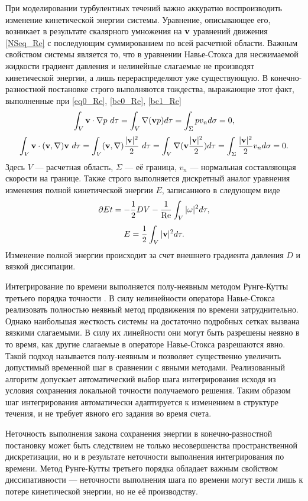 При моделировании турбулентных течений важно аккуратно воспроизводить изменение кинетической энергии системы. Уравнение, описывающее его, возникает в результате скалярного умножения на $\mathbf{v}$ уравнений движения \eqref{NSeq_Re} с последующим суммированием по всей расчетной области. Важным свойством системы является то, что в уравнении Навье-Стокса для несжимаемой жидкости градиент давления и нелинейные слагаемые не производят кинетической энергии, а лишь перераспределяют уже существующую. В конечно-разностной постановке строго выполняются тождества, выражающие этот факт, выполненные при \eqref{eq0_Re}, \eqref{bc0_Re}, \eqref{bc1_Re}
$$
\int_V \mathbf{v} \cdot \nabla p\ d\tau= \int_V \nabla (\mathbf{v} p) d\tau = \int_{\Sigma} p v_n d\sigma = 0, 
$$
$$
\int_V \mathbf{v} \cdot (\mathbf{v}, \nabla) \mathbf{v}\ d\tau = \int_V (\mathbf{v}, \nabla)\frac{|\mathbf{v}|^2}{2}\ d\tau = \int_V \nabla (\mathbf{v} \frac{|\mathbf{v}|^2}{2}) d\tau = \int_{\Sigma} \frac{|\mathbf{v}|^2}{2} v_n d\sigma = 0.
$$
Здесь $V$ --- расчетная область, $\Sigma$ --- её граница, $v_n$ --- нормальная составляющая скорости на границе. Также строго выполняется дискретный аналог уравнения изменения полной кинетической энергии $E$, записанного в следующем виде
\begin{equation} \label{Eeq}
\partial{E}{t} = - \frac{1}{2}DV - \frac{1}{\operatorname{Re}} \int_{V} |\omega|^2 d\tau,
\end{equation}
$$
E = \frac{1}{2}\int_{V} |\mathbf{v}|^2 d\tau.
$$
Изменение полной энергии происходит за счет внешнего градиента давления $D$ и вязкой диссипации. 

Интегрирование по времени выполняется полу-неявным методом Рунге-Кутты третьего порядка точности \cite{Nikitin2006third}. В силу нелинейности оператора Навье-Стокса реализовать полностью неявный метод продвижения по времени затруднительно. Однако наибольшая жесткость системы на достаточно подробных сетках вызвана вязкими слагаемыми. В силу их линейности они могут быть разрешены неявно в то время, как другие слагаемые в операторе Навье-Стокса разрешаются явно. Такой подход называется полу-неявным и позволяет существенно увеличить допустимый временной шаг в сравнении с явными методами. Реализованный алгоритм допускает автоматический выбор шага интегрирования исходя из условия сохранения локальной точности получаемого решения. Таким образом шаг интегрирования автоматически адаптируется к изменением в структуре течения, и не требует явного его задания во время счета. 

Неточность выполнения закона сохранения энергии в конечно-разностной постановку может быть следствием не только несовершенства пространственной дискретизации, но и в результате неточности выполнения интегрирования по времени. Метод Рунге-Кутты третьего порядка обладает важным свойством диссипативности --- неточности выполнения шага по времени могут вести лишь к потере кинетической энергии, но не её производству. 


